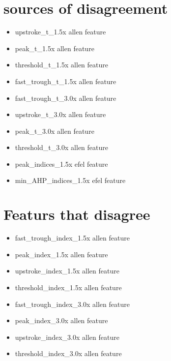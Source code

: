\section{sources of disagreement}
\begin{itemize}
    \item upstroke\_t\_1.5x allen feature
    \item  peak\_t\_1.5x allen feature
    \item threshold\_t\_1.5x allen feature
    \item fast\_trough\_t\_1.5x allen feature
    \item fast\_trough\_t\_3.0x allen feature
    \item upstroke\_t\_3.0x allen feature
    \item peak\_t\_3.0x allen feature
    \item threshold\_t\_3.0x allen feature
    \item peak\_indices\_1.5x efel feature
    \item min\_AHP\_indices\_1.5x efel feature
\end{itemize}



\section{Featurs that disagree} 
\begin{itemize}

    \item fast\_trough\_index\_1.5x allen feature
    \item peak\_index\_1.5x allen feature
    \item upstroke\_index\_1.5x allen feature
    \item threshold\_index\_1.5x allen feature
    \item fast\_trough\_index\_3.0x allen feature
    \item peak\_index\_3.0x allen feature
    \item upstroke\_index\_3.0x allen feature
    \item threshold\_index\_3.0x allen feature
\end{itemize}




